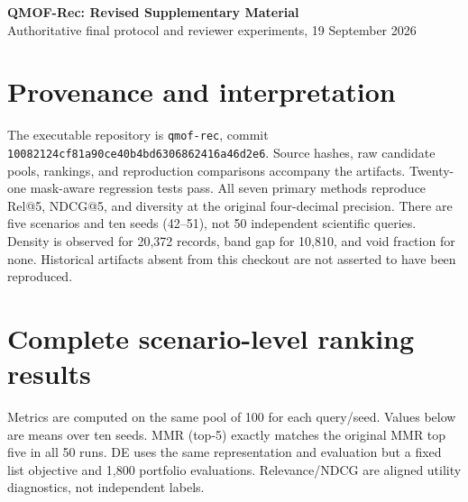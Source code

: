 \documentclass[11pt,a4paper]{article}
\begin{document}
\begin{center}{\Large\bfseries QMOF-Rec: Revised Supplementary Material}\\[5pt]
Authoritative final protocol and reviewer experiments, 19 September 2026\end{center}
\section*{Provenance and interpretation}
\label{sec:provenance}
The executable repository is \texttt{qmof-rec}, commit \texttt{10082124cf81a90ce40b4bd6306862416a46d2e6}. Source hashes, raw candidate pools, rankings, and reproduction comparisons accompany the artifacts. Twenty-one mask-aware regression tests pass. All seven primary methods reproduce Rel@5, NDCG@5, and diversity at the original four-decimal precision. There are five scenarios and ten seeds (42--51), not 50 independent scientific queries. Density is observed for 20,372 records, band gap for 10,810, and void fraction for none. Historical artifacts absent from this checkout are not asserted to have been reproduced.
\section*{Complete scenario-level ranking results}
\label{sec:scenario_results}
Metrics are computed on the same pool of 100 for each query/seed. Values below are means over ten seeds. MMR (top-5) exactly matches the original MMR top five in all 50 runs. DE uses the same representation and evaluation but a fixed list objective and 1,800 portfolio evaluations. Relevance/NDCG are aligned utility diagnostics, not independent labels.
\end{document}
